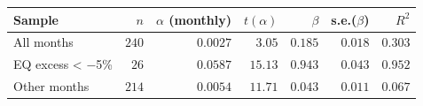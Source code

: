 \begin{tabular}{lrrrrrr}
\toprule
Sample & $n$ & $\alpha$ (monthly) & $t(\alpha)$ & $\beta$ & s.e.($\beta$) & $R^2$ \\
\midrule
All months & $240$ & $0.0027$ & $3.05$ & $0.185$ & $0.018$ & $0.303$ \\
EQ excess < $-$5\% & $26$ & $0.0587$ & $15.13$ & $0.943$ & $0.043$ & $0.952$ \\
Other months & $214$ & $0.0054$ & $11.71$ & $0.043$ & $0.011$ & $0.067$ \\
\bottomrule
\end{tabular}
